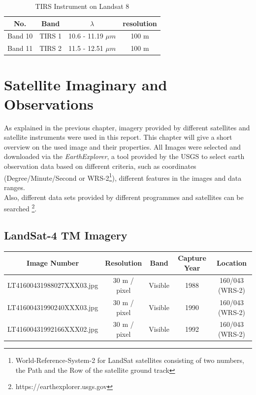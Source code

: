 \begin{table}[h!]
	\centering
	\begin{tabular}{ | c | c | c | c |}
	\hline
	\textbf{No.} & \textbf{Band} & \textbf{$\lambda$} & \textbf{resolution} \\
	\hline
	Band 10 & TIRS 1 & 10.6 - 11.19 $\mu m$ & {100 m} \\
	Band 11 & TIRS 2 & 11.5 - 12.51 $\mu m$ & {100 m} \\
	\hline
	\end{tabular}
	\caption{TIRS Instrument on Landsat 8}
	\label{tab:L8TIRS}
\end{table}


\section{Satellite Imaginary and Observations}
As explained in the previous chapter, imagery provided by different satellites and satellite instruments were used in this report. This chapter will give a short overview on the used image and their properties. All Images were selected and downloaded via the \textit{EarthExplorer}, a tool provided by the USGS to select earth observation data based on different criteria, such as coordinates (Degree/Minute/Second or WRS-2\footnote{World-Reference-System-2 for LandSat satellites consisting of two numbers, the Path and the Row of the satellite ground track}), different features in the images and data ranges.\\
Also, different data sets provided by different programmes and satellites can be searched \footnote{https://earthexplorer.usgs.gov}.\\

\subsection{LandSat-4 TM Imagery}

\begin{table} [h!]
	\centering
	\begin{tabular}{| c | c | c | c | c |}
	\hline
	\textbf{Image Number} & \textbf{Resolution} & \textbf{Band} & \textbf{Capture Year} & \textbf{Location} \\ \hline
	LT41600431988027XXX03.jpg & 30 m / pixel& Visible & 1988 & 160/043 (WRS-2) \\ \hline 
	LT41600431990240XXX03.jpg & 30 m / pixel& Visible & 1990 & 160/043 (WRS-2) \\ \hline 
	LT41600431992166XXX02.jpg & 30 m / pixel& Visible & 1992 & 160/043 (WRS-2) \\ \hline 
	\end{tabular}
\end{table}

